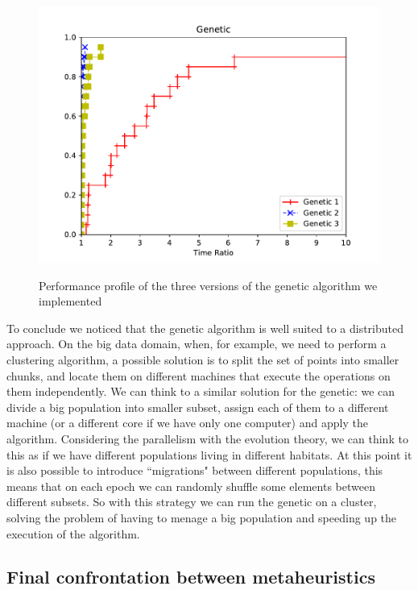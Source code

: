 \begin{figure}[h!]
\centering
	\includegraphics[scale=1]{media/genetic.pdf} \\
	\caption{Performance profile of the three versions of the genetic algorithm we implemented}
\end{figure}

\noindent To conclude we noticed that the genetic algorithm is well suited to a distributed approach. On the big data domain, when, for example, we need to perform a clustering algorithm, a possible solution is to split the set of points into smaller chunks, and locate them on different machines that execute the operations on them independently. We can think to a similar solution for the genetic: we can divide a big population into smaller subset, assign each of them to a different machine (or a different core if we have only one computer) and apply the algorithm. Considering the parallelism with the evolution theory, we can think to this as if we have different populations living in different habitats. At this point it is also possible to introduce ``migrations" between different populations, this means that on each epoch we can randomly shuffle some elements between different subsets. 
So with this strategy we can run the genetic on a cluster, solving the problem of having to menage a big population and speeding up the execution of the algorithm.


\subsection{Final confrontation between metaheuristics}

